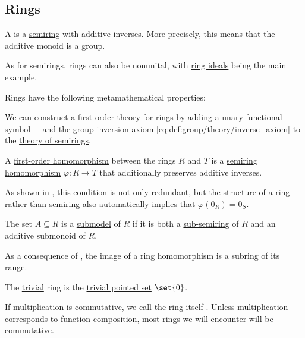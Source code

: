 \subsection{Rings}\label{subsec:rings}

\begin{definition}\label{def:ring}
  A  is a \hyperref[def:semiring]{semiring} with additive inverses. More precisely, this means that the additive monoid is a group.

  As for semirings, rings can also be nonunital, with \hyperref[def:semiring_ideal]{ring ideals} being the main example.

  Rings have the following metamathematical properties:
  \begin{thmenum}
     We can construct a \hyperref[def:first_order_theory]{first-order theory} for rings by adding a unary functional symbol \( - \) and the group inversion axiom \eqref{eq:def:group/theory/inverse_axiom} to the \hyperref[def:semiring/theory]{theory of semirings}.

     A \hyperref[def:first_order_homomorphism]{first-order homomorphism} between the rings \( R \) and \( T \) is a \hyperref[def:semiring/homomorphism]{semiring homomorphism} \( \varphi: R \to T \) that additionally preserves additive inverses.

    As shown in , this condition is not only redundant, but the structure of a ring rather than semiring also automatically implies that \( \varphi(0_R) = 0_S \).

     The set \( A \subseteq R \) is a \hyperref[thm:substructure_is_model]{submodel} of \( R \) if it is both a \hyperref[def:semiring]{sub-semiring} of \( R \) and an additive submonoid of \( R \).

    As a consequence of , the image of a ring homomorphism is a subring of its range.

     The \hyperref[thm:substructures_form_complete_lattice/bottom]{trivial} ring is the \hyperref[def:pointed_set/trivial]{trivial pointed set} \( \set{ 0 } \).

     If multiplication is commutative, we call the ring itself . Unless multiplication corresponds to function composition, most rings we will encounter will be commutative.


\end{thmenum}
\end{definition}

